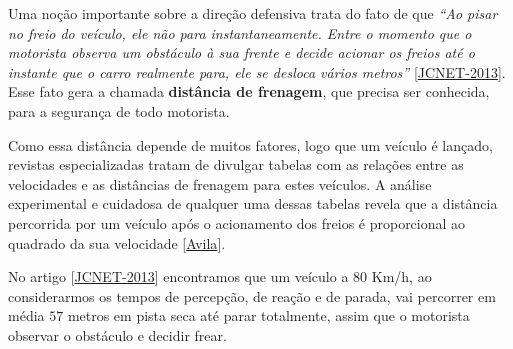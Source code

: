 \documentclass[10 pt,usenames,dvipsnames, oneside]{article}
\begin{document}
Uma noção importante sobre a direção defensiva trata do fato de que \textit{“Ao pisar no freio do veículo, ele não para instantaneamente. Entre o momento que o motorista observa um obstáculo à sua frente e decide acionar os freios até o instante que o carro realmente para, ele se desloca vários metros”} [\href{https://www.jcnet.com.br/noticias/geral/2013/02/367699-direcao-defensiva--saiba-como-a-velocidade-influi-na-frenagem-do-veiculo.html}{JCNET-2013}]. Esse fato gera a chamada \textbf{distância de frenagem}, que precisa ser conhecida, para a segurança de todo motorista.

Como essa distância depende de muitos fatores, logo que um veículo é lançado, revistas especializadas tratam de divulgar tabelas com as relações entre as velocidades e as distâncias de frenagem para estes veículos. A análise experimental e cuidadosa de qualquer uma dessas tabelas revela que a distância percorrida por um veículo após o acionamento dos freios é proporcional ao quadrado da sua velocidade [\href{http://rpm.org.br/cdrpm/12/5.htm}{Avila}].

No artigo [\href{https://www.jcnet.com.br/noticias/geral/2013/02/367699-direcao-defensiva--saiba-como-a-velocidade-influi-na-frenagem-do-veiculo.html}{JCNET-2013}] encontramos que um veículo a \(80\) Km/h, ao considerarmos os tempos de percepção, de reação e de parada, vai percorrer em média \(57\) metros em pista seca até parar totalmente, assim que o motorista observar o obstáculo e decidir frear.
\end{document}
